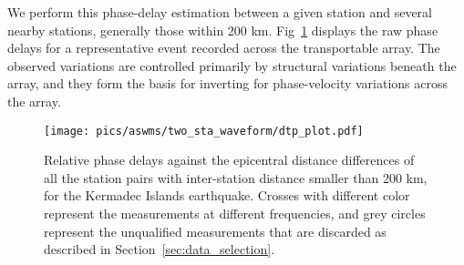 
We perform this phase-delay estimation between a given station and several nearby stations, generally those within 200 km.  Fig~\ref{fig:dtp} displays the raw phase delays for a representative event recorded across the transportable array. The observed variations are controlled primarily by structural variations beneath the array, and they form the basis for inverting for phase-velocity variations across the array.  

\begin{figure}
	\center
	\texttt{[image: pics/aswms/two\_sta\_waveform/dtp\_plot.pdf]}
	\caption{Relative phase delays against the epicentral distance differences of all the station pairs with inter-station distance smaller than 200 km, for the Kermadec Islands earthquake. Crosses with different color represent the measurements at different frequencies, and grey circles represent the unqualified measurements that are discarded as described in Section~\ref{sec:data_selection}.}
	\label{fig:dtp}
\end{figure}


